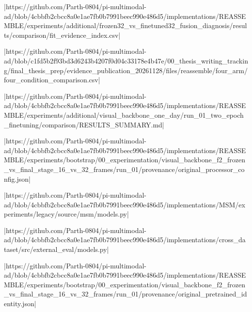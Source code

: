 |https://github.com/Parth-0804/pi-multimodal-ad/blob/4cbbfb2cbcc8a0e1ae7fb0b7991beec990e486d5/implementations/REASSEMBLE/experiments/additional/frozen32_vs_finetuned32_fusion_diagnosis/results/comparison/fit_evidence_index.csv|

|https://github.com/Parth-0804/pi-multimodal-ad/blob/c1fd5b2f93bd3d6243b4207f0d04c33178e4b47e/00_thesis_writing_tracking/final_thesis_prep/evidence_publication_20261128/files/reassemble/four_arm/four_condition_comparison.csv|

|https://github.com/Parth-0804/pi-multimodal-ad/blob/4cbbfb2cbcc8a0e1ae7fb0b7991beec990e486d5/implementations/REASSEMBLE/experiments/additional/visual_backbone_one_day/run_01_two_epoch_finetuning/comparison/RESULTS_SUMMARY.md|

|https://github.com/Parth-0804/pi-multimodal-ad/blob/4cbbfb2cbcc8a0e1ae7fb0b7991beec990e486d5/implementations/REASSEMBLE/experiments/bootstrap/00_experimentation/visual_backbone_f2_frozen_vs_final_stage_16_vs_32_frames/run_01/provenance/original_processor_config.json|

|https://github.com/Parth-0804/pi-multimodal-ad/blob/4cbbfb2cbcc8a0e1ae7fb0b7991beec990e486d5/implementations/MSM/experiments/legacy/source/msm/models.py|

|https://github.com/Parth-0804/pi-multimodal-ad/blob/4cbbfb2cbcc8a0e1ae7fb0b7991beec990e486d5/implementations/cross_dataset/src/external_eval/models.py|

|https://github.com/Parth-0804/pi-multimodal-ad/blob/4cbbfb2cbcc8a0e1ae7fb0b7991beec990e486d5/implementations/REASSEMBLE/experiments/bootstrap/00_experimentation/visual_backbone_f2_frozen_vs_final_stage_16_vs_32_frames/run_01/provenance/original_pretrained_identity.json|

